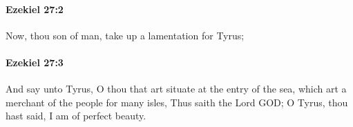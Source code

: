 		\paragraph{Ezekiel 27:2} %
			\label{EZEKIEL-27-2}

			Now, thou son of man, take up a lamentation for Tyrus;


		\paragraph{Ezekiel 27:3} %
			\label{EZEKIEL-27-3}

			And say unto Tyrus, O thou that art situate at the entry of the sea, which art a merchant of the people for many isles, Thus saith the Lord GOD; O Tyrus, thou hast said, I am of perfect beauty.


